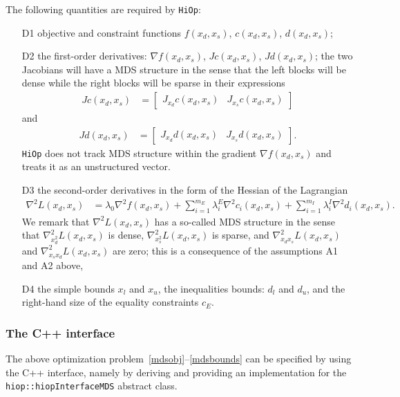 \documentclass[11pt]{article}
\newcommand{\Hi}{\texttt{HiOp}\xspace}
\begin{document}
The following quantities are required by \Hi:
\begin{itemize}
\item[D1] objective and constraint functions $f(x_d,x_s)$, $c(x_d,x_s)$, $d(x_d,x_s)$;
\item[D2] the first-order derivatives: $\nabla f(x_d,x_s)$, $Jc(x_d,x_s)$, $Jd(x_d,x_s)$; the two Jacobians will have a MDS structure in the sense that the left blocks will be dense while the right blocks will be sparse in their expressions
\begin{align}
Jc(x_d,x_s) &= \left[\begin{array}{cc} J_{x_d} c(x_d,x_s) &  J_{x_s} c(x_d,x_s)\end{array}\right] 
\end{align}
and
\begin{align}
Jd(x_d,x_s) &= \left[\begin{array}{cc} J_{x_d} d(x_d,x_s) &  J_{x_s} d(x_d,x_s)\end{array}\right]. \label{mdsJac}
\end{align}
\Hi does not track MDS structure within the gradient $\nabla f(x_d,x_s)$ and treats it as an unstructured vector.
\item[D3] the second-order derivatives in the form of the Hessian of the Lagrangian
\begin{align}
\nabla^2 L(x_d,x_s)& = \lambda_0 \nabla^2 f(x_d,x_s) + \sum_{i=1}^{m_E} \lambda_i^E \nabla^2 c_i(x_d,x_s) + \sum_{i=1}^{m_I} \lambda_i^I \nabla^2 d_i(x_d,x_s).\label{mdsHess}
\end{align}
We remark that  $\nabla^2 L(x_d,x_s)$ has a so-called MDS structure in the sense that $\nabla^2_{x_d^2} L(x_d,x_s)$ is dense, $\nabla^2_{x_s^2} L(x_d,x_s)$ is sparse, and $\nabla^2_{x_d x_s} L(x_d,x_s)$ and $\nabla^2_{x_s x_d} L(x_d,x_s)$ are zero; this is a consequence of the assumptions A1 and A2 above,

\item[D4] the simple bounds $x_l$ and $x_u$, the inequalities bounds: $d_l$ and $d_u$, and the right-hand size of the equality constraints $c_E$.
\end{itemize}

\subsubsection{The C++ interface}
The above optimization problem~\eqref{mdsobj}--\eqref{mdsbounds} can be specified by using the C++ interface, namely by deriving and providing an implementation for the \texttt{hiop::hiopInterfaceMDS} abstract class.
\end{document}
